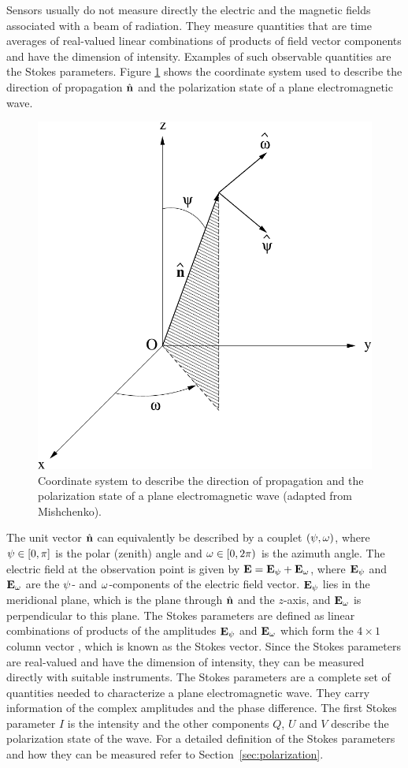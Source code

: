 Sensors usually do not measure directly the electric and the magnetic
fields associated with a beam of radiation. They measure quantities
that are time averages of real-valued linear combinations of products
of field vector components and have the dimension of intensity.
Examples of such observable quantities are the Stokes parameters.
Figure \ref{fig:RT_theory_coordinates} shows the coordinate system used
to describe the direction of propagation $\hat{{\bf n}}$ and the
polarization state of a plane electromagnetic wave.
\begin{figure}[t]
 \begin{center}
   \includegraphics*[width=0.6\hsize]{coordinate_system}
   \caption{Coordinate system to describe the direction of propagation and the polarization state of a plane electromagnetic wave (adapted from Mishchenko).}
  \label{fig:RT_theory_coordinates}  
 \end{center}
\end{figure}
The unit vector $\hat{{\bf n}}$ can equivalently be described by a
couplet $(\psi, \omega)$, where ${\psi \in [0,\pi]}$ is the polar
(zenith) angle and $\omega \in [0,2\pi)$ is the azimuth angle. The
electric field at the observation point is given by $\mathbf{E} =
\mathbf{E}_{\psi} + \mathbf{E}_{\omega}$, where $ \mathbf{E}_{\psi}$ and
$\mathbf{E}_{\omega}$ are the $\psi$- and $\omega$-components of the
electric field vector.  $\mathbf{E}_{\psi}$ lies in the meridional
plane, which is the plane through $\hat{{\bf n}}$ and the $z$-axis, and
$\mathbf{E}_{\omega}$ is perpendicular to this plane.
The Stokes parameters are defined as linear combinations of products
of the amplitudes $\mathbf{E}_{\psi}$ and  $\mathbf{E}_{\omega}$ which
form the $4\times1$ column vector \StoVec,
which is known as the Stokes vector.  Since the Stokes parameters are
real-valued and have the dimension of intensity, they can be measured
directly with suitable instruments. The Stokes parameters are a
complete set of quantities needed to characterize a plane
electromagnetic wave. They carry information of the complex amplitudes
and the phase difference.  The first Stokes parameter $I$ is the
intensity and the other components $Q$, $U$ and $V$ describe the
polarization state of the wave. For a detailed definition of the
Stokes parameters and how they can be measured refer to
Section~\ref{sec:polarization}.

